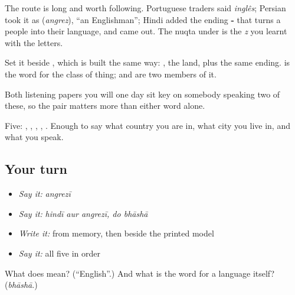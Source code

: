 The route is long and worth following. Portuguese traders said \emph{inglês}; Persian took it as  (\emph{angrez}), \textquotedblleft{}an Englishman\textquotedblright{}; Hindi added the ending \textbf{-} that turns a people into their language, and  came out. The nuqta under  is the \emph{z} you learnt with the letters.

Set it beside \textbf{}, which is built the same way: , the land, plus the same ending.  is the word for the class of thing;  and  are two members of it.

Both listening papers you will one day sit key on somebody speaking two of these, so the pair matters more than either word alone.

\begin{grammarlens}[title={What you've built}]
Five: , , , , . Enough to say what country you are in, what city you live in, and what you speak.
\end{grammarlens}

\subsection*{Your turn}
\begin{itemize}
\raggedright
  \item \emph{Say it:} \emph{angrezī}
  \item \emph{Say it:} \emph{hindī aur angrezī, do bhāshā}
  \item \emph{Write it:}  from memory, then  beside the printed model
  \item \emph{Say it:} all five in order
\end{itemize}

\begin{tcolorbox}[breakable,colback=teal!4,colframe=teal!35!black,title={Before you move on}]
What does  mean? (\textquotedblleft{}English\textquotedblright{}.) And what is the word for a language itself? (\emph{bhāshā}.)
\end{tcolorbox}
